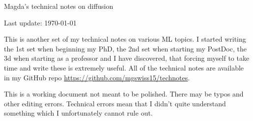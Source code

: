 \documentclass[a4paper, oneside, 10pt]{article}
\theoremstyle{plain}
\theoremstyle{mytheoremstyle}
\theoremstyle{definition}
\theoremstyle{mydefstyle}
\begin{document}
\graphicspath{ {./Pics/} }

\setlength{\parindent}{0pt}
\setlength{\parskip}{1ex plus 0.5ex minus 0.2ex}


{\large Magda's technical notes on diffusion}

{\hfill Last update: \today}

This is another set of my technical notes on various ML topics.
I started writing the 1st set when beginning my PhD, the 2nd set when starting my PostDoc, the 3d when starting as a professor and I have discovered, that forcing myself to take time and write these is extremely useful.
All of the technical notes are available in my GitHub repo \url{https://github.com/mgswiss15/technotes}.

This is a working document not meant to be polished. There may be typos and other editing errors. 
Technical errors mean that I didn't quite understand something which I unfortunately cannot rule out.


\tableofcontents




\clearpage 
\printbibliography



\cleardoublepage
{}
\printindex
\end{document}
